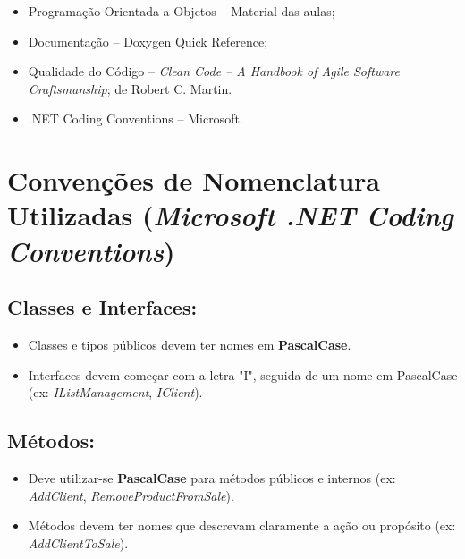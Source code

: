 \documentclass[
]{article}
\begin{document}
\begin{itemize}
\item
  Programação Orientada a Objetos -- Material das aulas;
\item
  Documentação -- Doxygen Quick Reference;
\item
  Qualidade do Código -- \emph{Clean Code -- A Handbook of Agile
  Software Craftsmanship}; de Robert C. Martin.
\item
  .NET Coding Conventions -- Microsoft.
\end{itemize}

\hypertarget{convenuxe7uxf5es-de-nomenclatura-utilizadas-microsoft-.net-coding-conventions}{%
\section{\texorpdfstring{Convenções de Nomenclatura Utilizadas
(\emph{Microsoft .NET Coding
Conventions})}{Convenções de Nomenclatura Utilizadas (Microsoft .NET Coding Conventions)}}\label{convenuxe7uxf5es-de-nomenclatura-utilizadas-microsoft-.net-coding-conventions}}

\hypertarget{classes-e-interfaces}{%
\subsection{Classes e Interfaces:}\label{classes-e-interfaces}}

\begin{itemize}
\item
  Classes e tipos públicos devem ter nomes em \textbf{PascalCase}.
\item
  Interfaces devem começar com a letra "I", seguida de um nome em
  PascalCase (ex: \emph{IListManagement}, \emph{IClient}).
\end{itemize}

\hypertarget{muxe9todos}{%
\subsection{Métodos:}\label{muxe9todos}}

\begin{itemize}
\item
  Deve utilizar-se \textbf{PascalCase} para métodos públicos e internos
  (ex: \emph{AddClient}, \emph{RemoveProductFromSale}).
\item
  Métodos devem ter nomes que descrevam claramente a ação ou propósito
  (ex: \emph{AddClientToSale}).
\end{itemize}
\end{document}
